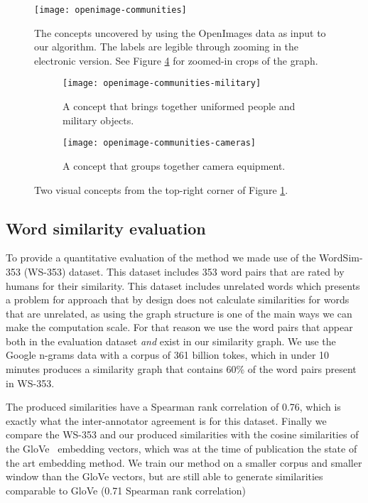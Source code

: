\begin{figure}
	\centering
	\texttt{[image: openimage-communities]}
	\caption{The concepts uncovered by using the OpenImages data as input to our algorithm.
	The labels are legible through zooming in the electronic version. See Figure \ref{fig:openimage-zoom} for zoomed-in crops of the graph.}
	\label{fig:openimages-concepts}
\end{figure}


\begin{figure}
	\centering
	\begin{subfigure}{\textwidth}
		\centering
		\texttt{[image: openimage-communities-military]}
		\caption{A concept that brings together uniformed people and military objects.}
		\label{fig:openimages-military}
	\end{subfigure}
	\begin{subfigure}{\textwidth}
		\centering
		\texttt{[image: openimage-communities-cameras]}
		\caption{A concept that groups together camera equipment.}
		\label{fig:openimages-cameras}
	\end{subfigure}
	\caption{Two visual concepts from the top-right corner of
		Figure \ref{fig:openimages-concepts}.}
	\label{fig:openimage-zoom}
\end{figure}

\subsection{Word similarity evaluation}

To provide a quantitative evaluation of the method we made use of the WordSim-353 (WS-353)
dataset. This dataset includes 353 word pairs that are rated by humans for their
similarity. This dataset includes unrelated words which presents a problem for
approach that by design does not calculate similarities for words that are unrelated,
as using the graph structure is one of the main ways we can make the computation
scale. For that reason we use the word pairs that appear both in the evaluation
dataset \textit{and} exist in our similarity graph. We use the Google n-grams
data with a corpus of 361 billion tokes, which in under 10 minutes produces
a similarity graph that contains 60\% of the word pairs present in WS-353.

The produced similarities have a Spearman rank correlation of 0.76, which
is exactly what the inter-annotator agreement is for this dataset.
Finally we compare the WS-353 and our produced similarities with the
cosine similarities of the GloVe~\cite{glove} embedding vectors,
which was at the time of publication the state of the art embedding
method. We train our method on a smaller corpus and smaller window than
the GloVe vectors, but are still able to generate similarities comparable
to GloVe (0.71 Spearman rank correlation)